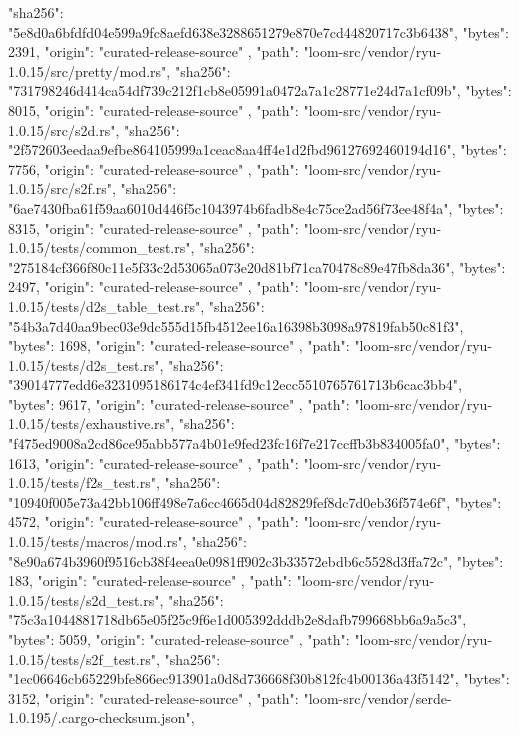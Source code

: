 {{      "sha256": "5e8d0a6bfdfd04e599a9fc8aefd638e3288651279e870e7cd44820717c3b6438",
      "bytes": 2391,
      "origin": "curated-release-source"
    },
    {
      "path": "loom-src/vendor/ryu-1.0.15/src/pretty/mod.rs",
      "sha256": "731798246d414ca54df739c212f1cb8e05991a0472a7a1c28771e24d7a1cf09b",
      "bytes": 8015,
      "origin": "curated-release-source"
    },
    {
      "path": "loom-src/vendor/ryu-1.0.15/src/s2d.rs",
      "sha256": "2f572603eedaa9efbe864105999a1ceac8aa4ff4e1d2fbd96127692460194d16",
      "bytes": 7756,
      "origin": "curated-release-source"
    },
    {
      "path": "loom-src/vendor/ryu-1.0.15/src/s2f.rs",
      "sha256": "6ae7430fba61f59aa6010d446f5c1043974b6fadb8e4c75ce2ad56f73ee48f4a",
      "bytes": 8315,
      "origin": "curated-release-source"
    },
    {
      "path": "loom-src/vendor/ryu-1.0.15/tests/common_test.rs",
      "sha256": "275184cf366f80c11e5f33c2d53065a073e20d81bf71ca70478c89e47fb8da36",
      "bytes": 2497,
      "origin": "curated-release-source"
    },
    {
      "path": "loom-src/vendor/ryu-1.0.15/tests/d2s_table_test.rs",
      "sha256": "54b3a7d40aa9bec03e9dc555d15fb4512ee16a16398b3098a97819fab50c81f3",
      "bytes": 1698,
      "origin": "curated-release-source"
    },
    {
      "path": "loom-src/vendor/ryu-1.0.15/tests/d2s_test.rs",
      "sha256": "39014777edd6e3231095186174c4ef341fd9c12ecc5510765761713b6cac3bb4",
      "bytes": 9617,
      "origin": "curated-release-source"
    },
    {
      "path": "loom-src/vendor/ryu-1.0.15/tests/exhaustive.rs",
      "sha256": "f475ed9008a2cd86ce95abb577a4b01e9fed23fc16f7e217ccffb3b834005fa0",
      "bytes": 1613,
      "origin": "curated-release-source"
    },
    {
      "path": "loom-src/vendor/ryu-1.0.15/tests/f2s_test.rs",
      "sha256": "10940f005e73a42bb106ff498e7a6cc4665d04d82829fef8dc7d0eb36f574e6f",
      "bytes": 4572,
      "origin": "curated-release-source"
    },
    {
      "path": "loom-src/vendor/ryu-1.0.15/tests/macros/mod.rs",
      "sha256": "8e90a674b3960f9516cb38f4eea0e0981ff902c3b33572ebdb6c5528d3ffa72c",
      "bytes": 183,
      "origin": "curated-release-source"
    },
    {
      "path": "loom-src/vendor/ryu-1.0.15/tests/s2d_test.rs",
      "sha256": "75c3a1044881718db65e05f25c9f6e1d005392dddb2e8dafb799668bb6a9a5c3",
      "bytes": 5059,
      "origin": "curated-release-source"
    },
    {
      "path": "loom-src/vendor/ryu-1.0.15/tests/s2f_test.rs",
      "sha256": "1ec06646cb65229bfe866ec913901a0d8d736668f30b812fc4b00136a43f5142",
      "bytes": 3152,
      "origin": "curated-release-source"
    },
    {
      "path": "loom-src/vendor/serde-1.0.195/.cargo-checksum.json",
}}
